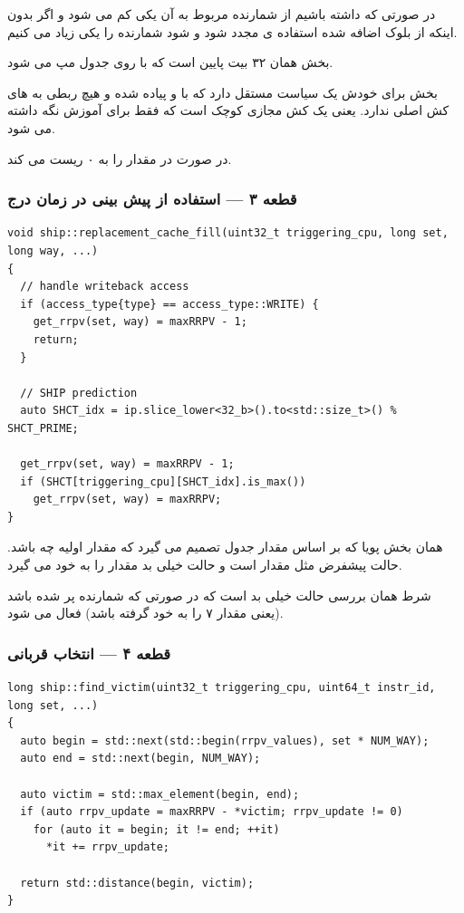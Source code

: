 \documentclass[12pt,a4paper]{article}
\begin{document}
در صورتی که  داشته باشیم از شمارنده مربوط به آن  یکی کم می شود و اگر بدون اینکه از بلوک اضافه شده استفاده ی مجدد شود و  شود شمارنده را یکی زیاد می کنیم.

بخش  همان ۳۲ بیت پایین  است که با  روی جدول مپ می شود.

بخش  برای خودش یک سیاست  مستقل دارد که با  و  پیاده شده و هیچ ربطی به  های کش اصلی ندارد. یعنی  یک کش مجازی کوچک است که فقط برای آموزش نگه داشته می شود.

در صورت  در  مقدار  را به ۰ ریست می کند.

\subsubsection{قطعه ۳ — استفاده از پیش بینی در زمان درج}

\begin{latin}
\begin{lstlisting}
void ship::replacement_cache_fill(uint32_t triggering_cpu, long set, long way, ...)
{
  // handle writeback access
  if (access_type{type} == access_type::WRITE) {
    get_rrpv(set, way) = maxRRPV - 1;
    return;
  }

  // SHIP prediction
  auto SHCT_idx = ip.slice_lower<32_b>().to<std::size_t>() % SHCT_PRIME;

  get_rrpv(set, way) = maxRRPV - 1;
  if (SHCT[triggering_cpu][SHCT_idx].is_max())
    get_rrpv(set, way) = maxRRPV;
}
\end{lstlisting}
\end{latin}

همان بخش پویا که بر اساس مقدار جدول تصمیم می گیرد که مقدار اولیه  چه باشد. حالت پیشفرض مثل  مقدار  است و حالت خیلی بد مقدار  را به خود می گیرد.

شرط  همان بررسی حالت خیلی بد است که در صورتی که شمارنده پر شده باشد (یعنی مقدار ۷ را به خود گرفته باشد) فعال می شود.

\subsubsection{قطعه ۴ — انتخاب قربانی}

\begin{latin}
\begin{lstlisting}
long ship::find_victim(uint32_t triggering_cpu, uint64_t instr_id, long set, ...)
{
  auto begin = std::next(std::begin(rrpv_values), set * NUM_WAY);
  auto end = std::next(begin, NUM_WAY);

  auto victim = std::max_element(begin, end);
  if (auto rrpv_update = maxRRPV - *victim; rrpv_update != 0)
    for (auto it = begin; it != end; ++it)
      *it += rrpv_update;

  return std::distance(begin, victim);
}
\end{lstlisting}
\end{latin}
\end{document}
